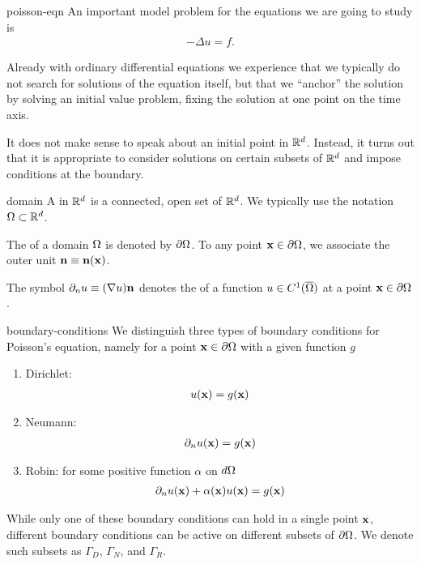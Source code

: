 \begin{Definition}{poisson-eqn}
  An important model problem for the equations we are going to study
  is 
  \begin{gather}
    \label{eq:Poisson}
    -\Delta u = f.
  \end{gather}
\end{Definition}

\begin{intro}
  Already with ordinary differential equations we experience that we
  typically do not search for solutions of the equation itself, but
  that we ``anchor'' the solution by solving an initial value problem,
  fixing the solution at one point on the time axis.

  It does not make sense to speak about an initial point in
  $\mathbb R^d$. Instead, it turns out that it is appropriate to consider
  solutions on certain subsets of $\mathbb R^d$ and impose conditions at the
  boundary.
\end{intro}

\begin{Definition}{domain}
  A  in $\mathbb R^d$ is a connected, open set of $\mathbb R^d$. We
  typically use the notation $\Omega\subset\mathbb R^d$.

  The  of a domain $\Omega$ is denoted by
  $\partial\Omega$. To any point $\mathbf x\in\partial\Omega$, we associate the outer
  unit  $\mathbf n \equiv \mathbf n(\mathbf x)$.

  The symbol $\partial_n u \equiv (\nabla u) \mathbf n$ denotes the  of a function $u\in C^1(\overline{\Omega})$ at a point
  $\mathbf x\in\partial\Omega$.
\end{Definition}

\begin{Definition}{boundary-conditions}
  We distinguish three types of boundary conditions for Poisson's
  equation, namely for a point $\mathbf x\in\partial\Omega$ with a given function $g$
  \begin{enumerate}
  \item Dirichlet:
    \begin{gather*}
      u(\mathbf x) = g(\mathbf x)
    \end{gather*}
  \item Neumann:
    \begin{gather*}
      \partial_n u(\mathbf x) = g(\mathbf x)
    \end{gather*}
  \item Robin: for some positive function $\alpha$ on $d\Omega$
    \begin{gather*}
      \partial_n u(\mathbf x) + \alpha(\mathbf x) u(\mathbf x) = g(\mathbf x)
    \end{gather*}
  \end{enumerate}
  While only one of these boundary conditions can hold in a single
  point $\mathbf x$, different boundary conditions can be active on
  different subsets of $\partial\Omega$. We denote such subsets as
  $\Gamma_D$, $\Gamma_N$, and $\Gamma_R$.
\end{Definition}

